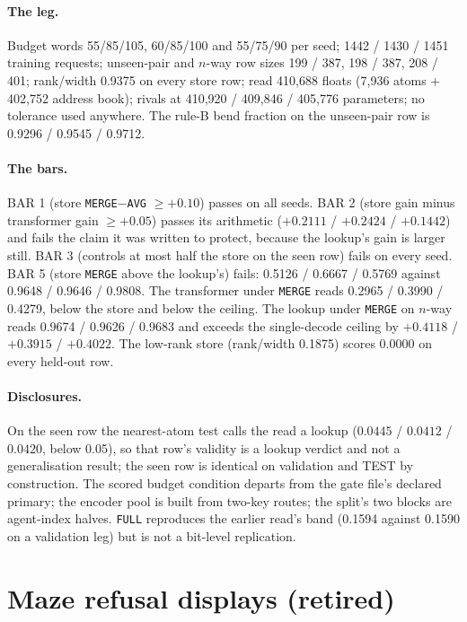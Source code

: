 \documentclass{article}
\begin{document}
\paragraph{The leg.} Budget words 55/85/105, 60/85/100 and 55/75/90 per seed; 1442 / 1430 / 1451
training requests; unseen-pair and $n$-way row sizes 199 / 387, 198 / 387, 208 / 401; rank/width
0.9375 on every store row; read 410,688 floats (7,936 atoms + 402,752 address book); rivals at
410,920 / 409,846 / 405,776 parameters; no tolerance used anywhere. The rule-B bend fraction on the
unseen-pair row is 0.9296 / 0.9545 / 0.9712.

\paragraph{The bars.} BAR 1 (store \texttt{MERGE}$-$\texttt{AVG} $\ge+0.10$) passes on all seeds.
BAR 2 (store gain minus transformer gain $\ge+0.05$) passes its arithmetic ($+0.2111$ / $+0.2424$
/ $+0.1442$) and fails the claim it was written to protect, because the lookup's gain is larger
still. BAR 3 (controls at most half the store on the seen row) fails on every seed. BAR 5 (store
\texttt{MERGE} above the lookup's) fails: 0.5126 / 0.6667 / 0.5769 against 0.9648 / 0.9646 /
0.9808. The transformer under \texttt{MERGE} reads 0.2965 / 0.3990 / 0.4279, below the store and
below the ceiling. The lookup under \texttt{MERGE} on $n$-way reads 0.9674 / 0.9626 / 0.9683 and
exceeds the single-decode ceiling by $+0.4118$ / $+0.3915$ / $+0.4022$. The low-rank store
(rank/width 0.1875) scores 0.0000 on every held-out row.

\paragraph{Disclosures.} On the seen row the nearest-atom test calls the read a lookup
($0.0445$ / $0.0412$ / $0.0420$, below 0.05), so that row's validity is a lookup verdict and not a
generalisation result; the seen row is identical on validation and TEST by construction. The
scored budget condition departs from the gate file's declared primary; the encoder pool is built
from two-key routes; the split's two blocks are agent-index halves. \texttt{FULL} reproduces the
earlier read's band (0.1594 against 0.1590 on a validation leg) but is not a bit-level
replication.

\section{Maze refusal displays (retired)}
\label{app:mazerefusal}
\end{document}
